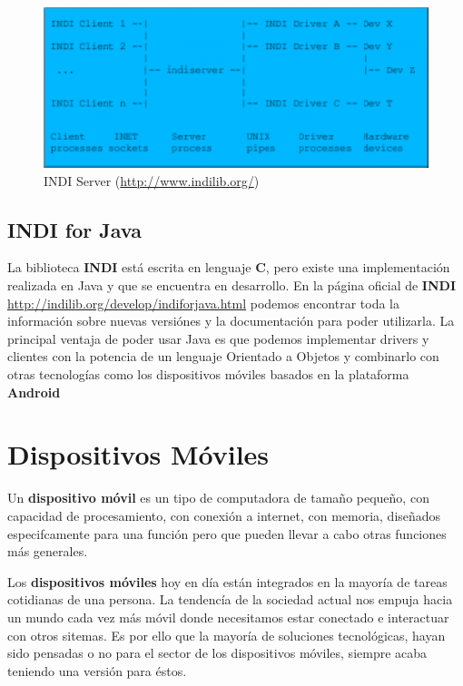 \bigskip
\begin{figure}[!ht]
  \begin{center}
    \includegraphics[width=1\textwidth]{../images/Indi_server.png}
    \caption{INDI Server (\url{http://www.indilib.org/})}
    \label{fig:indi_server}
  \end{center}
\end{figure}

\bigskip

\subsection{INDI for Java}

La biblioteca \textbf{INDI} está escrita en lenguaje \textbf{C}, pero existe una implementación realizada en Java y que se encuentra en desarrollo. En la página oficial de \textbf{INDI} \url{http://indilib.org/develop/indiforjava.html} podemos encontrar toda la información sobre nuevas versiónes y la documentación para poder utilizarla. La principal ventaja de poder usar Java es que podemos implementar drivers y clientes con la potencia de un lenguaje Orientado a Objetos y combinarlo con otras tecnologías como los dispositivos móviles basados en la plataforma \textbf{Android}


\newpage

\section{Dispositivos Móviles}

Un \textbf{dispositivo móvil} es un tipo de computadora de tamaño pequeño, con capacidad de procesamiento, con conexión a internet, con memoria, diseñados especifcamente para una función pero que pueden llevar a cabo otras funciones más generales.

\bigskip
Los \textbf{dispositivos móviles} hoy en día están integrados en la mayoría de tareas cotidianas de una persona. La tendencía de la sociedad actual nos empuja hacia un mundo cada vez más móvil donde necesitamos estar conectado e interactuar con otros sitemas. Es por ello que la mayoría de soluciones tecnológicas, hayan sido pensadas o no para el sector de los dispositivos móviles, siempre acaba teniendo una versión para éstos.


